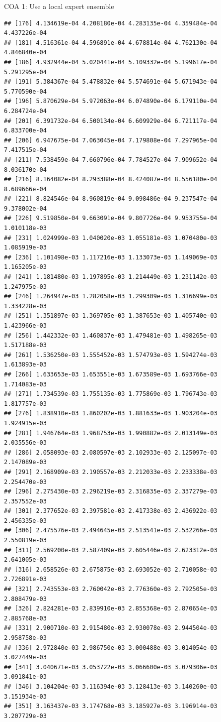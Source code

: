 \documentclass[ignorenonframetext,]{beamer}
\begin{document}
\begin{frame}[fragile]{COA 1: Use a local expert ensemble}
\begin{verbatim}
## [176] 4.134619e-04 4.208180e-04 4.283135e-04 4.359484e-04 4.437226e-04
## [181] 4.516361e-04 4.596891e-04 4.678814e-04 4.762130e-04 4.846840e-04
## [186] 4.932944e-04 5.020441e-04 5.109332e-04 5.199617e-04 5.291295e-04
## [191] 5.384367e-04 5.478832e-04 5.574691e-04 5.671943e-04 5.770590e-04
## [196] 5.870629e-04 5.972063e-04 6.074890e-04 6.179110e-04 6.284724e-04
## [201] 6.391732e-04 6.500134e-04 6.609929e-04 6.721117e-04 6.833700e-04
## [206] 6.947675e-04 7.063045e-04 7.179808e-04 7.297965e-04 7.417515e-04
## [211] 7.538459e-04 7.660796e-04 7.784527e-04 7.909652e-04 8.036170e-04
## [216] 8.164082e-04 8.293388e-04 8.424087e-04 8.556180e-04 8.689666e-04
## [221] 8.824546e-04 8.960819e-04 9.098486e-04 9.237547e-04 9.378002e-04
## [226] 9.519850e-04 9.663091e-04 9.807726e-04 9.953755e-04 1.010118e-03
## [231] 1.024999e-03 1.040020e-03 1.055181e-03 1.070480e-03 1.085919e-03
## [236] 1.101498e-03 1.117216e-03 1.133073e-03 1.149069e-03 1.165205e-03
## [241] 1.181480e-03 1.197895e-03 1.214449e-03 1.231142e-03 1.247975e-03
## [246] 1.264947e-03 1.282058e-03 1.299309e-03 1.316699e-03 1.334228e-03
## [251] 1.351897e-03 1.369705e-03 1.387653e-03 1.405740e-03 1.423966e-03
## [256] 1.442332e-03 1.460837e-03 1.479481e-03 1.498265e-03 1.517188e-03
## [261] 1.536250e-03 1.555452e-03 1.574793e-03 1.594274e-03 1.613893e-03
## [266] 1.633653e-03 1.653551e-03 1.673589e-03 1.693766e-03 1.714083e-03
## [271] 1.734539e-03 1.755135e-03 1.775869e-03 1.796743e-03 1.817757e-03
## [276] 1.838910e-03 1.860202e-03 1.881633e-03 1.903204e-03 1.924915e-03
## [281] 1.946764e-03 1.968753e-03 1.990882e-03 2.013149e-03 2.035556e-03
## [286] 2.058093e-03 2.080597e-03 2.102933e-03 2.125097e-03 2.147089e-03
## [291] 2.168909e-03 2.190557e-03 2.212033e-03 2.233338e-03 2.254470e-03
## [296] 2.275430e-03 2.296219e-03 2.316835e-03 2.337279e-03 2.357552e-03
## [301] 2.377652e-03 2.397581e-03 2.417338e-03 2.436922e-03 2.456335e-03
## [306] 2.475576e-03 2.494645e-03 2.513541e-03 2.532266e-03 2.550819e-03
## [311] 2.569200e-03 2.587409e-03 2.605446e-03 2.623312e-03 2.641005e-03
## [316] 2.658526e-03 2.675875e-03 2.693052e-03 2.710058e-03 2.726891e-03
## [321] 2.743553e-03 2.760042e-03 2.776360e-03 2.792505e-03 2.808479e-03
## [326] 2.824281e-03 2.839910e-03 2.855368e-03 2.870654e-03 2.885768e-03
## [331] 2.900710e-03 2.915480e-03 2.930078e-03 2.944504e-03 2.958758e-03
## [336] 2.972840e-03 2.986750e-03 3.000488e-03 3.014054e-03 3.027449e-03
## [341] 3.040671e-03 3.053722e-03 3.066600e-03 3.079306e-03 3.091841e-03
## [346] 3.104204e-03 3.116394e-03 3.128413e-03 3.140260e-03 3.151934e-03
## [351] 3.163437e-03 3.174768e-03 3.185927e-03 3.196914e-03 3.207729e-03

\end{verbatim}
\end{frame}
\end{document}
